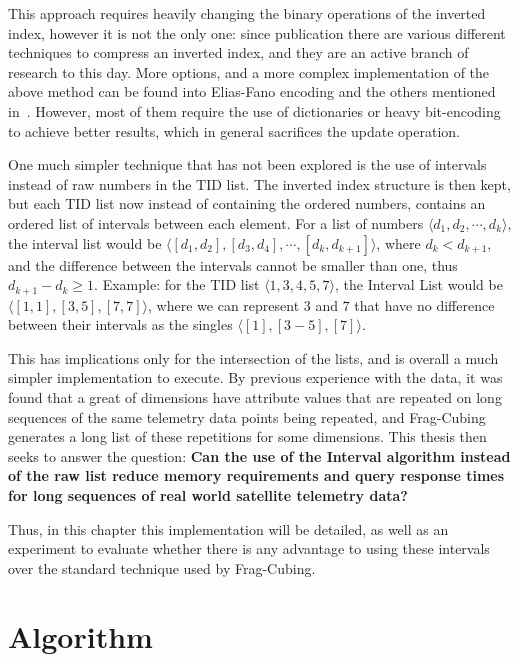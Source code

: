 This approach requires heavily changing the binary operations of the inverted index, however it is not the only one: since publication there are various different techniques to compress an inverted index, and they are an active branch of research to this day.
More options, and a more complex implementation of the above method can be found into Elias-Fano encoding and the others mentioned in~\cite{pibiriTechniquesInvertedIndex2019}.
However, most of them require the use of dictionaries or heavy bit-encoding to achieve better results, which in general sacrifices the update operation.

One much simpler technique that has not been explored is the use of intervals instead of raw numbers in the TID list.
The inverted index structure is then kept, but each TID list now instead of containing the ordered numbers, contains an ordered list of intervals between each element.
For a list of numbers $\langle d_1, d_2 , \cdots, d_k \rangle$, the interval list would be $\langle [d_1, d_2] , [d_3, d_4], \cdots, [d_k, d_{k + 1}] \rangle$, where $d_k < d_{k+1}$, and the difference between the intervals cannot be smaller than one, thus $d_{k+1} - d_k \geq 1$.
Example: for the TID list $\langle 1, 3, 4, 5, 7 \rangle$, the Interval List would be $\langle [1, 1], [3, 5], [7, 7] \rangle$, where we can represent $3$ and $7$ that have no difference between their intervals as the singles $\langle [1], [3-5], [7] \rangle$.

This has implications only for the intersection of the lists, and is overall a much simpler implementation to execute.
By previous experience with the data, it was found that a great of dimensions have attribute values that are repeated on long sequences of the same telemetry data points being repeated, and Frag-Cubing generates a long list of these repetitions for some dimensions.
This thesis then seeks to answer the question: \textbf{Can the use of the Interval algorithm instead of the raw list reduce memory requirements and query response times for long sequences of real world satellite telemetry data?}

Thus, in this chapter this implementation will be detailed, as well as an experiment to evaluate whether there is any advantage to using these intervals over the standard technique used by Frag-Cubing.

\section{Algorithm}\label{ch:interval:algo}

